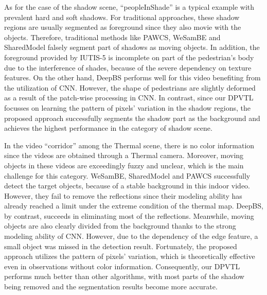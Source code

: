 \documentclass[journal]{IEEEtran}
\begin{document}
As for the case of the shadow scene, ``peopleInShade'' is a typical example with prevalent hard and soft shadows. 
For traditional approaches, these shadow regions are usually segmented as foreground since they also movie with the objects. 
Therefore, traditional methods like PAWCS, WeSamBE and SharedModel falsely segment part of shadows as moving objects. 
In addition, the foreground provided by IUTIS-5 is incomplete on part of the pedestrian's body due to the interference of shades, 
because of the severe dependency on texture features. 
On the other hand, DeepBS performs well for this video benefiting from the utilization of CNN. 
However, the shape of pedestrians are slightly deformed as a result of the patch-wise processing in CNN. 
In contrast, since our DPVTL focusses on learning the pattern of pixels' variation in the shadow regions, 
the proposed approach successfully segments the shadow part as the background and achieves the highest performance in the category of shadow scene.

In the video ``corridor'' among the Thermal scene, there is no color information since the videos are obtained through a Thermal camera. 
Moreover, moving objects in these videos are exceedingly fuzzy and unclear, which is the main challenge for this category. 
WeSamBE, SharedModel and PAWCS successfully detect the target objects, because of a stable background in this indoor video. 
However, they fail to remove the reflections since their modeling ability has already reached a limit under the extreme condition of the thermal map. 
DeepBS, by contrast, succeeds in eliminating most of the reflections. 
Meanwhile, moving objects are also clearly divided from the background thanks to the strong modeling ability of CNN. 
However, due to the dependency of the edge feature, a small object was missed in the detection result. 
Fortunately, the proposed approach utilizes the pattern of pixels' variation, which is theoretically effective even in observations without color information. 
Consequently, our DPVTL performs much better than other algorithms, with most parts of the shadow being removed and the segmentation results become more accurate.
\end{document}
